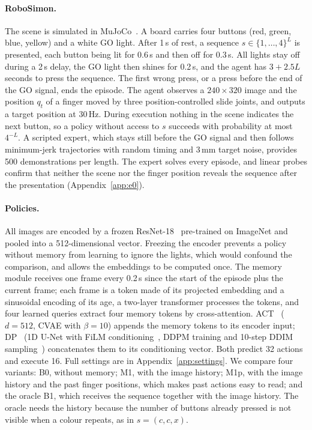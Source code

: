 \documentclass[10pt,a4paper]{article}
\begin{document}
\paragraph{RoboSimon.} The scene is simulated in MuJoCo~\citep{todorov2012mujoco}. A board carries four buttons (red, green, blue, yellow) and a white GO light. After 1\,s of rest, a sequence $s\in\{1,\dots,4\}^L$ is presented, each button being lit for 0.6\,s and then off for 0.3\,s. All lights stay off during a 2\,s delay, the GO light then shines for 0.2\,s, and the agent has $3+2.5L$ seconds to press the sequence. The first wrong press, or a press before the end of the GO signal, ends the episode. The agent observes a $240\times320$ image and the position $q_t$ of a finger moved by three position-controlled slide joints, and outputs a target position at 30\,Hz. During execution nothing in the scene indicates the next button, so a policy without access to $s$ succeeds with probability at most $4^{-L}$. A scripted expert, which stays still before the GO signal and then follows minimum-jerk trajectories with random timing and 3\,mm target noise, provides 500 demonstrations per length. The expert solves every episode, and linear probes confirm that neither the scene nor the finger position reveals the sequence after the presentation (Appendix~\ref{app:e0}).

\paragraph{Policies.} All images are encoded by a frozen ResNet-18~\citep{he2016resnet} pre-trained on ImageNet and pooled into a 512-dimensional vector. Freezing the encoder prevents a policy without memory from learning to ignore the lights, which would confound the comparison, and allows the embeddings to be computed once. The memory module receives one frame every 0.2\,s since the start of the episode plus the current frame; each frame is a token made of its projected embedding and a sinusoidal encoding of its age, a two-layer transformer processes the tokens, and four learned queries extract four memory tokens by cross-attention. ACT~\citep{zhao2023act} ($d=512$, CVAE with $\beta=10$) appends the memory tokens to its encoder input; DP~\citep{chi2023diffusion} (1D U-Net with FiLM conditioning~\citep{perez2018film}, DDPM training and 10-step DDIM sampling~\citep{ho2020ddpm,song2021ddim}) concatenates them to its conditioning vector. Both predict 32 actions and execute 16. Full settings are in Appendix~\ref{app:settings}. We compare four variants: B0, without memory; M1, with the image history; M1p, with the image history and the past finger positions, which makes past actions easy to read; and the oracle B1, which receives the sequence together with the image history. The oracle needs the history because the number of buttons already pressed is not visible when a colour repeats, as in $s=(c,c,x)$.
\end{document}
